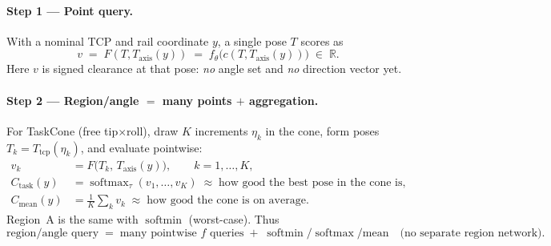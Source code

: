 \documentclass[11pt,a4paper]{article}
\newcommand{\R}{\mathbb{R}}
\newcommand{\Tcp}{T_{\mathrm{tcp}}}
\newcommand{\Taxis}{T_{\mathrm{axis}}}
\newcommand{\softmin}{\operatorname{softmin}}
\newcommand{\softmax}{\operatorname{softmax}}
\begin{document}
\paragraph{Step 1 --- Point query.}
With a nominal TCP and rail coordinate \(y\), a single pose \(T\) scores as
\begin{equation}
\label{eq:point-clearance}
  v
  \;=\;
  F(T,\Taxis(y))
  \;=\;
  f_{\theta}\bigl(c(T,\Taxis(y))\bigr)
  \;\in\;
  \R.
\end{equation}
Here \(v\) is signed clearance at that pose: \emph{no} angle set and \emph{no}
direction vector yet.

\paragraph{Step 2 --- Region/angle $=$ many points $+$ aggregation.}
For TaskCone (free tip$\times$roll), draw \(K\) increments \(\eta_{k}\) in the
cone, form poses \(T_{k}=\Tcp(\eta_{k})\), and evaluate pointwise:
\begin{equation}
\label{eq:task-pipe}
\begin{aligned}
  v_{k}
  &=
  F\bigl(T_{k},\,\Taxis(y)\bigr),
  \qquad
  k=1,\ldots,K,
  \\
  C_{\mathrm{task}}(y)
  &=
  \softmax_{\tau}(v_{1},\ldots,v_{K})
  \;\approx\;
  \text{how good the best pose in the cone is},
  \\
  C_{\mathrm{mean}}(y)
  &=
  \tfrac{1}{K}\sum_{k} v_{k}
  \;\approx\;
  \text{how good the cone is on average}.
\end{aligned}
\end{equation}
Region~A is the same with \(\softmin\) (worst-case). Thus
\[
  \text{region/angle query}
  \;=\;
  \text{many pointwise }f\text{ queries}
  \;+\;
  \softmin/\softmax/\mathrm{mean}
  \quad\text{(no separate region network)}.
\]
\end{document}

